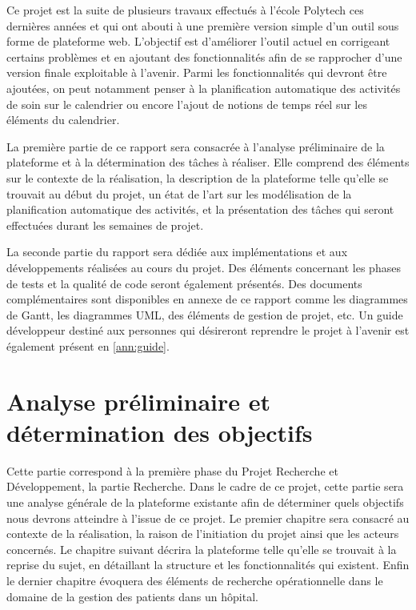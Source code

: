 \documentclass[noposter]{polytech/polytech}
\begin{document}
Ce projet est la suite de plusieurs travaux effectués à l'école Polytech ces dernières années et qui ont abouti à une première version simple d'un outil sous forme de plateforme web. L'objectif est d'améliorer l'outil actuel en corrigeant certains problèmes et en ajoutant des fonctionnalités afin de se rapprocher d'une version finale exploitable à l'avenir. Parmi les fonctionnalités qui devront être ajoutées, on peut notamment penser à la planification automatique des activités de soin sur le calendrier ou encore l'ajout de notions de temps réel sur les éléments du calendrier.

La première partie de ce rapport sera consacrée à l'analyse préliminaire de la plateforme et à la détermination des tâches à réaliser. Elle comprend des éléments sur le contexte de la réalisation, la description de la plateforme telle qu'elle se trouvait au début du projet, un état de l'art sur les modélisation de la planification automatique des activités, et la présentation des tâches qui seront effectuées durant les semaines de projet. 

La seconde partie du rapport sera dédiée aux implémentations et aux développements réalisées au cours du projet. Des éléments concernant les phases de tests et la qualité de code seront également présentés. Des documents complémentaires sont disponibles en annexe de ce rapport comme les diagrammes de Gantt, les diagrammes UML, des éléments de gestion de projet, etc. Un guide développeur destiné aux personnes qui désireront reprendre le projet à l'avenir est également présent en \autoref{ann:guide}.


\part{Analyse préliminaire et détermination des objectifs}


Cette partie correspond à la première phase du Projet Recherche et Développement, la partie Recherche. Dans le cadre de ce projet, cette partie sera une analyse générale de la plateforme existante afin de déterminer quels objectifs nous devrons atteindre à l'issue de ce projet. Le premier chapitre sera consacré au contexte de la réalisation, la raison de l'initiation du projet ainsi que les acteurs concernés. Le chapitre suivant décrira la plateforme telle qu'elle se trouvait à la reprise du sujet, en détaillant la structure et les fonctionnalités qui existent. Enfin le dernier chapitre évoquera des éléments de recherche opérationnelle dans le domaine de la gestion des patients dans un hôpital. 
\end{document}
